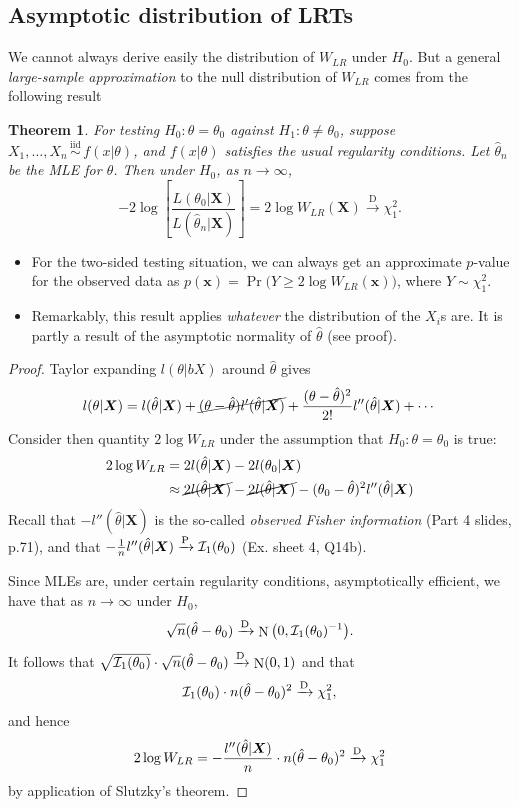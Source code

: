 \documentclass[
]{book}
\newcommand{\bx}{{\boldsymbol x}}
\newcommand{\bX}{{\boldsymbol X}}
\DeclareMathOperator{\N}{N}
\newcommand{\iid}{\,\overset{\text{iid}}{\sim}\,}
\newcommand{\cI}{{\mathcal I}}
\newtheorem{theorem}{Theorem}[chapter]
\theoremstyle{definition}
\theoremstyle{definition}
\theoremstyle{definition}
\theoremstyle{definition}
\theoremstyle{remark}
\begin{document}
\hypertarget{asymptotic-distribution-of-lrts}{%
\subsection{Asymptotic distribution of LRTs}\label{asymptotic-distribution-of-lrts}}

We cannot always derive easily the distribution of \(W_{LR}\) under \(H_0\). But a general \emph{large-sample approximation} to the null distribution of \(W_{LR}\) comes from the following result

\begin{theorem}
For testing \(H_0:\theta=\theta_0\) against \(H_1:\theta \neq\theta_0\), suppose \(X_1,\dots,X_n\iid f(x|\theta)\), and \(f(x|\theta)\) satisfies the usual regularity conditions. Let \(\hat\theta_n\) be the MLE for \(\theta\). Then under \(H_0\), as \(n\to\infty\),
\[
-2\log \left[ \frac{L(\theta_0|\bX)}{L(\hat\theta_n|\bX)} \right]= 2\log W_{LR}(\bX)  \xrightarrow{\text{D}} \chi^2_1.
\]
\end{theorem}

\begin{itemize}
\item
  For the two-sided testing situation, we can always get an approximate \(p\)-value for the observed data as \(p(\bx) = \Pr\big(Y\geq 2\log W_{LR}(\bx)\big)\), where \(Y\sim\chi^2_1\).
\item
  Remarkably, this result applies \emph{whatever} the distribution of the \(X_i\)s are. It is partly a result of the asymptotic normality of \(\hat\theta\) (see proof).
\end{itemize}

\begin{proof}
Taylor expanding \(l(\theta|bX)\) around \(\hat\theta\) gives
\[
l(\theta|\bX) = l(\hat\theta|\bX) + \cancel{(\theta-\hat\theta)l'(\hat\theta|\bX)} + \frac{(\theta-\hat\theta)^2}{2!}l''(\hat\theta|\bX) + \cdots
\]
Consider then quantity \(2\log W_{LR}\) under the assumption that \(H_0:\theta=\theta_0\) is true:
\begin{align*}
2\log W_{LR} 
&= 2l(\hat\theta|\bX) - 2l(\theta_0|\bX) \\
&\approx \cancel{2l(\hat\theta|\bX)} - \cancel{2l(\hat\theta|\bX)} - (\theta_0-\hat\theta)^2 l''(\hat\theta|\bX)
\end{align*}
Recall that \(-l''(\hat\theta|\bX)\) is the so-called \emph{observed Fisher information} (Part 4 slides, p.71), and that \(-\frac{1}{n}l''(\hat\theta|\bX) \xrightarrow{\text P} \cI_1(\theta_0)\) (Ex. sheet 4, Q14b).

Since MLEs are, under certain regularity conditions, asymptotically efficient, we have that as \(n\to\infty\) under \(H_0\),
\[
\sqrt n(\hat\theta - \theta_0) \xrightarrow{\text D} \N\big(0,\cI_1(\theta_0)^{-1}\big).
\]
It follows that \(\sqrt{\cI_1(\theta_0)}\cdot \sqrt n(\hat\theta - \theta_0) \xrightarrow{\text D} \N(0,1)\) and that
\[
\cI_1(\theta_0) \cdot n(\hat\theta - \theta_0)^2 \xrightarrow{\text D} \chi^2_1,
\]
and hence
\[
2\log W_{LR} = -\frac{l''(\hat\theta|\bX)}{n}\cdot  n(\hat\theta - \theta_0)^2  \xrightarrow{\text D} \chi^2_1
\]
by application of Slutzky's theorem.
\end{proof}
\end{document}
